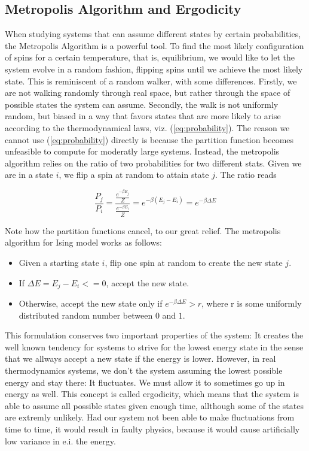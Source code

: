 \subsection{Metropolis Algorithm and Ergodicity}\label{metropolis}
When studying systems that can assume different states by certain probabilities, the Metropolis Algorithm is a powerful tool. To find the most likely configuration of spins for a certain temperature, that is, equilibrium, we would like to let the system evolve in a random fashion, flipping spins until we achieve the most likely state. This is reminiscent of a random walker, with some differences. Firstly, we are not walking randomly through real space, but rather through the space of possible states the system can assume. Secondly, the walk is not uniformly random, but biased in a way that favors states that are more likely to arise according to the thermodynamical laws, viz. (\ref{eq:probability}). The reason we cannot use (\ref{eq:probability}) directly is because the partition function becomes unfeasible to compute for moderatly large systems. Instead, the metropolis algorithm relies on the ratio of two probabilities for two different stats. Given we are in a state 
$i$, we flip a spin at random to attain state $j$. The ratio reads

\begin{equation}
    \frac{P_j}{P_i} = \frac{\frac{e^{-\beta E_j}}{Z}}{\frac{e^{-\beta E_i}}{Z}} = 
    e^{-\beta (E_j- E_i)} = e^{-\beta\Delta E} 
\end{equation}\label{eq:acceptAmp}

Note how the partition functions cancel, to our great relief. The metropolis algorithm for Ising model works as follows: 
\begin{itemize}
  \item Given a starting state $i$, flip one spin at random to create the new state $j$. 
  \item If $\Delta E = E_j - E_i <= 0$, accept the new state.
  \item Otherwise, accept the new state only if $e^{-\beta\Delta E}>r$, where r is some uniformly distributed random number between $0$ and $1$.
\end{itemize}

This formulation conserves two important properties of the system: It creates the well known tendency for systems to strive for the lowest energy state in the sense that we allways accept a new state if the energy is lower. However, in real thermodynamics systems, we don't the system assuming the lowest possible energy and stay there: It fluctuates. We must allow it to sometimes go up in energy as well. This concept is called ergodicity, which means that the system is able to assume all possible states given enough time, allthough some of the states are extremly unlikely. Had our system not been able to make fluctuations from time to time, it would result in faulty physics, because it would cause artificially low variance in e.i. the energy.

